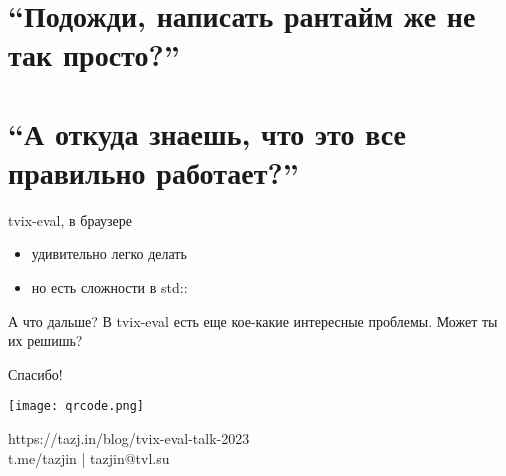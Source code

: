 \documentclass[12pt]{beamer}
\newenvironment{code}{\ttfamily}{\par}
\begin{document}

  \section{``Подожди, написать рантайм же не так просто?''}


  \section{``А откуда знаешь, что это все правильно работает?''}


  \begin{frame}{tvix-eval, в браузере}
    \begin{itemize}
    \item удивительно легко делать
    \item но есть сложности в \begin{code}std::\end{code}
    \end{itemize}
  \end{frame}

  \begin{frame}{А что дальше?}
    В tvix-eval есть еще кое-какие интересные проблемы. Может ты их
    решишь?
  \end{frame}

  \begin{frame}{Спасибо!}
    \begin{center}
      \texttt{[image: qrcode.png]}

      https://tazj.in/blog/tvix-eval-talk-2023 \\
      t.me/tazjin | tazjin@tvl.su
    \end{center}
  \end{frame}
\end{document}
